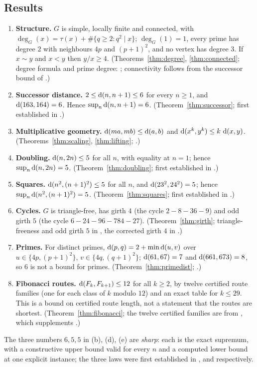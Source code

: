 \subsection{Results}
\begin{theorem}[Summary]\label{thm:summary}
\begin{enumerate}[label=(\alph*),itemsep=1pt]
\item \textbf{Structure.} $G$ is simple, locally finite and connected, with $\deg_G(x)=\tau(x)+\#\{q\ge2:q^2\mid x\}$; $\deg_G(1)=1$, every prime has degree $2$ with neighbours $4p$ and $(p+1)^2$, and no vertex has degree $3$. If $x\sim y$ and $x<y$ then $y/x\ge4$. (Theorems~\ref{thm:degree}, \ref{thm:connected}; degree formula and prime degree: \cite{u2tidyn}; connectivity follows from the successor bound of \cite{u1bnd}.)
\item \textbf{Successor distance.} $2\le \operatorname{d}(n,n+1)\le6$ for every $n\ge1$, and $\operatorname{d}(163,164)=6$. Hence $\sup_n\operatorname{d}(n,n+1)=6$. (Theorem~\ref{thm:successor}; first established in \cite{u1bnd}.)
\item \textbf{Multiplicative geometry.} $\operatorname{d}(ma,mb)\le\operatorname{d}(a,b)$ and $\operatorname{d}(x^k,y^k)\le k\,\operatorname{d}(x,y)$. (Theorems~\ref{thm:scaling}, \ref{thm:lifting}; \cite{u2sq}.)
\item \textbf{Doubling.} $\operatorname{d}(n,2n)\le5$ for all $n$, with equality at $n=1$; hence $\sup_n\operatorname{d}(n,2n)=5$. (Theorem~\ref{thm:doubling}; first established in \cite{u2}.)
\item \textbf{Squares.} $\operatorname{d}(n^2,(n+1)^2)\le5$ for all $n$, and $\operatorname{d}(23^2,24^2)=5$; hence $\sup_n\operatorname{d}(n^2,(n+1)^2)=5$. (Theorem~\ref{thm:squares}; first established in \cite{u2sq}.)
\item \textbf{Cycles.} $G$ is triangle-free, has girth $4$ (the cycle $2\!-\!8\!-\!36\!-\!9$) and odd girth $5$ (the cycle $6\!-\!24\!-\!96\!-\!784\!-\!27$). (Theorem~\ref{thm:girth}; triangle-freeness and odd girth $5$ in \cite{u3}, the corrected girth $4$ in \cite{u3cor}.)
\item \textbf{Primes.} For distinct primes, $\operatorname{d}(p,q)=2+\min\operatorname{d}(u,v)$ over $u\in\{4p,(p+1)^2\}$, $v\in\{4q,(q+1)^2\}$; $\operatorname{d}(61,67)=7$ and $\operatorname{d}(661,673)=8$, so $6$ is not a bound for primes. (Theorem~\ref{thm:primedist}; \cite{u2fp}.)
\item \textbf{Fibonacci routes.} $\operatorname{d}(F_k,F_{k+1})\le12$ for all $k\ge2$, by twelve certified route families (one for each class of $k$ modulo $12$) and an exact table for $k\le29$. This is a bound on certified route length, not a statement that the routes are shortest. (Theorem~\ref{thm:fibonacci}; the twelve certified families are from \cite{u2fpsym}, which supplements \cite{u2fp}.)
\end{enumerate}
\end{theorem}
The three numbers $6,5,5$ in (b), (d), (e) are \emph{sharp}: each is the exact supremum, with a constructive upper bound valid for every $n$ and a computed lower bound at one explicit instance; the three laws were first established in \cite{u1bnd}, \cite{u2} and \cite{u2sq} respectively.

